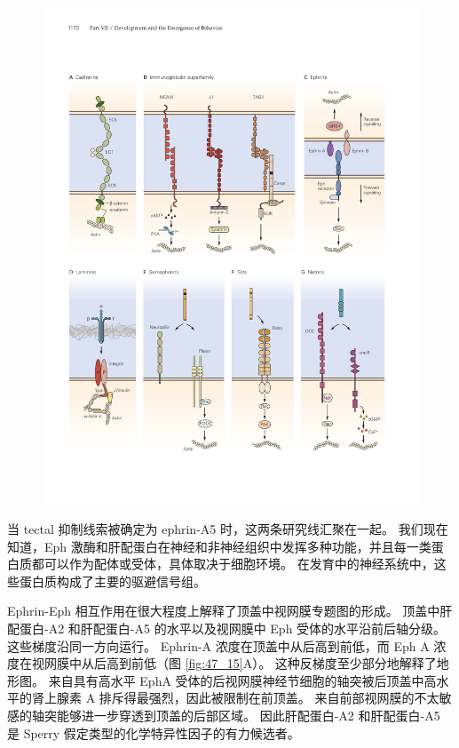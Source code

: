 \begin{figure}[htbp]
	\centering
	\includegraphics[width=0.95\linewidth]{chap47/fig_47_11}
	\caption{}
	\label{fig:47_11}
\end{figure}

当 tectal 抑制线索被确定为 ephrin-A5 时，这两条研究线汇聚在一起。 我们现在知道，Eph 激酶和肝配蛋白在神经和非神经组织中发挥多种功能，并且每一类蛋白质都可以作为配体或受体，具体取决于细胞环境。 在发育中的神经系统中，这些蛋白质构成了主要的驱避信号组。

Ephrin-Eph 相互作用在很大程度上解释了顶盖中视网膜专题图的形成。 顶盖中肝配蛋白-A2 和肝配蛋白-A5 的水平以及视网膜中 Eph 受体的水平沿前后轴分级。 这些梯度沿同一方向运行。 
Ephrin-A 浓度在顶盖中从后高到前低，而 Eph A 浓度在视网膜中从后高到前低（图 \ref{fig:47_15}A）。 
这种反梯度至少部分地解释了地形图。 来自具有高水平 EphA 受体的后视网膜神经节细胞的轴突被后顶盖中高水平的肾上腺素 A 排斥得最强烈，因此被限制在前顶盖。 来自前部视网膜的不太敏感的轴突能够进一步穿透到顶盖的后部区域。 因此肝配蛋白-A2 和肝配蛋白-A5 是 Sperry 假定类型的化学特异性因子的有力候选者。

